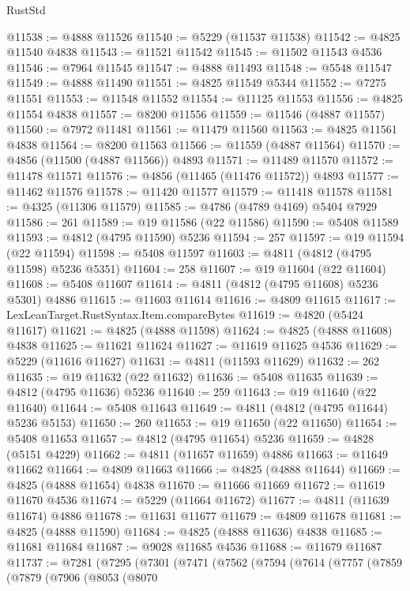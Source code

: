 \begin{lexlean}{RustStd}
\begin{coremodule}
{\begin{coremodule}
{{{{{{{{{{{{{{{{{{{{{{{{{{{{{{{{{{{{{{{{{{{{{{{{{{{{{{{{{{{{{{{{{{{{{{{{{{{{{{{{@11538 := @4888 @11526
@11540 := @5229 (@11537 @11538)
@11542 := @4825 @11540 @4838
@11543 := @11521 @11542
@11545 := @11502 @11543 @4536
@11546 := @7964 @11545
@11547 := @4888 @11493
@11548 := @5548 @11547
@11549 := @4888 @11490
@11551 := @4825 @11549 @5344
@11552 := @7275 @11551
@11553 := @11548 @11552
@11554 := @11125 @11553
@11556 := @4825 @11554 @4838
@11557 := @8200 @11556
@11559 := @11546 (@4887 @11557)
@11560 := @7972 @11481
@11561 := @11479 @11560
@11563 := @4825 @11561 @4838
@11564 := @8200 @11563
@11566 := @11559 (@4887 @11564)
@11570 := @4856 (@11500 (@4887 @11566)) @4893
@11571 := @11489 @11570
@11572 := @11478 @11571
@11576 := @4856 (@11465 (@11476 @11572)) @4893
@11577 := @11462 @11576
@11578 := @11420 @11577
@11579 := @11418 @11578
@11581 := @4325 (@11306 @11579)
@11585 := @4786 (@4789 @4169) @5404 @7929
@11586 := 261
@11589 := @19 @11586 (@22 @11586)
@11590 := @5408 @11589
@11593 := @4812 (@4795 @11590) @5236
@11594 := 257
@11597 := @19 @11594 (@22 @11594)
@11598 := @5408 @11597
@11603 := @4811 (@4812 (@4795 @11598) @5236 @5351)
@11604 := 258
@11607 := @19 @11604 (@22 @11604)
@11608 := @5408 @11607
@11614 := @4811 (@4812 (@4795 @11608) @5236 @5301) @4886
@11615 := @11603 @11614
@11616 := @4809 @11615
@11617 := LexLeanTarget.RustSyntax.Item.compareBytes
@11619 := @4820 (@5424 @11617)
@11621 := @4825 (@4888 @11598)
@11624 := @4825 (@4888 @11608) @4838
@11625 := @11621 @11624
@11627 := @11619 @11625 @4536
@11629 := @5229 (@11616 @11627)
@11631 := @4811 (@11593 @11629)
@11632 := 262
@11635 := @19 @11632 (@22 @11632)
@11636 := @5408 @11635
@11639 := @4812 (@4795 @11636) @5236
@11640 := 259
@11643 := @19 @11640 (@22 @11640)
@11644 := @5408 @11643
@11649 := @4811 (@4812 (@4795 @11644) @5236 @5153)
@11650 := 260
@11653 := @19 @11650 (@22 @11650)
@11654 := @5408 @11653
@11657 := @4812 (@4795 @11654) @5236
@11659 := @4828 (@5151 @4229)
@11662 := @4811 (@11657 @11659) @4886
@11663 := @11649 @11662
@11664 := @4809 @11663
@11666 := @4825 (@4888 @11644)
@11669 := @4825 (@4888 @11654) @4838
@11670 := @11666 @11669
@11672 := @11619 @11670 @4536
@11674 := @5229 (@11664 @11672)
@11677 := @4811 (@11639 @11674) @4886
@11678 := @11631 @11677
@11679 := @4809 @11678
@11681 := @4825 (@4888 @11590)
@11684 := @4825 (@4888 @11636) @4838
@11685 := @11681 @11684
@11687 := @9028 @11685 @4536
@11688 := @11679 @11687
@11737 := @7281
    (@7295
      (@7301
        (@7471
          (@7562
            (@7594
              (@7614
                (@7757
                  (@7859
                    (@7879
                      (@7906
                        (@8053
                          (@8070
}}}}}}}}}}}}}}}}}}}}}}}}}}}}}}}}}}}}}}}}}}}}}}}}}}}}}}}}}}}}}}}}}}}}}}}}}}}}}}}}
\end{coremodule}}
\end{coremodule}
\end{lexlean}
